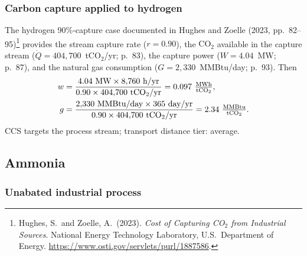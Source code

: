 \documentclass[11pt]{article}
\newcommand{\cotwo}{\ensuremath{\mathrm{CO_2}}}
\begin{document}
\subsubsection{Carbon capture applied to hydrogen}

The hydrogen 90\%-capture case documented in Hughes and Zoelle (2023, pp.~82--95)\footnote{Hughes, S.\ and Zoelle, A.\ (2023). \emph{Cost of Capturing CO$_2$ from Industrial Sources}. National Energy Technology Laboratory, U.S.\ Department of Energy. \url{https://www.osti.gov/servlets/purl/1887586}.} provides the stream capture rate ($r = 0.90$), the \cotwo{} available in the capture stream ($\dot{Q} = 404{,}700$~t\cotwo{}/yr; p.~83), the capture power ($W = 4.04$~MW; p.~87), and the natural gas consumption ($G = 2{,}330$~MMBtu/day; p.~93). Then
%
\begin{align*}
  w &= \frac{4.04~\text{MW} \times 8{,}760~\text{h/yr}}{0.90 \times 404{,}700~\text{t\cotwo{}/yr}} = 0.097~\tfrac{\text{MWh}}{\text{t\cotwo{}}}, \\
  g &= \frac{2{,}330~\text{MMBtu/day} \times 365~\text{day/yr}}{0.90 \times 404{,}700~\text{t\cotwo{}/yr}} = 2.34~\tfrac{\text{MMBtu}}{\text{t\cotwo{}}}.
\end{align*}
%
CCS targets the process stream; transport distance tier: average.

\subsection{Ammonia}
\label{sec:const_nh3}

\subsubsection{Unabated industrial process}
\end{document}
